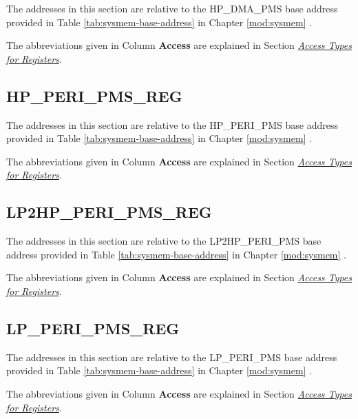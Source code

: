 \documentclass[main\_\_EN.tex]{subfiles}
\begin{document}
The addresses in this section are relative to the HP\_DMA\_PMS base address provided in Table \ref{tab:sysmem-base-address} in Chapter \ref{mod:sysmem} \textit{}.

The abbreviations given in Column \textbf{Access} are explained in Section \hyperref[glossary-access-types]{\textit{Access Types for Registers}}.



\subsection{HP\_PERI\_PMS\_REG}
\label{sec:permctrl-reg-hp}

The addresses in this section are relative to the HP\_PERI\_PMS base address provided in Table \ref{tab:sysmem-base-address} in Chapter \ref{mod:sysmem} \textit{}.

The abbreviations given in Column \textbf{Access} are explained in Section \hyperref[glossary-access-types]{\textit{Access Types for Registers}}.



\subsection{LP2HP\_PERI\_PMS\_REG}
\label{sec:permctrl-reg-lp2hp}

The addresses in this section are relative to the LP2HP\_PERI\_PMS base address provided in Table \ref{tab:sysmem-base-address} in Chapter \ref{mod:sysmem} \textit{}.

The abbreviations given in Column \textbf{Access} are explained in Section \hyperref[glossary-access-types]{\textit{Access Types for Registers}}.



\subsection{LP\_PERI\_PMS\_REG}
\label{sec:permctrl-reg-lp}

The addresses in this section are relative to the LP\_PERI\_PMS base address provided in Table \ref{tab:sysmem-base-address} in Chapter \ref{mod:sysmem} \textit{}.

The abbreviations given in Column \textbf{Access} are explained in Section \hyperref[glossary-access-types]{\textit{Access Types for Registers}}.
\end{document}
